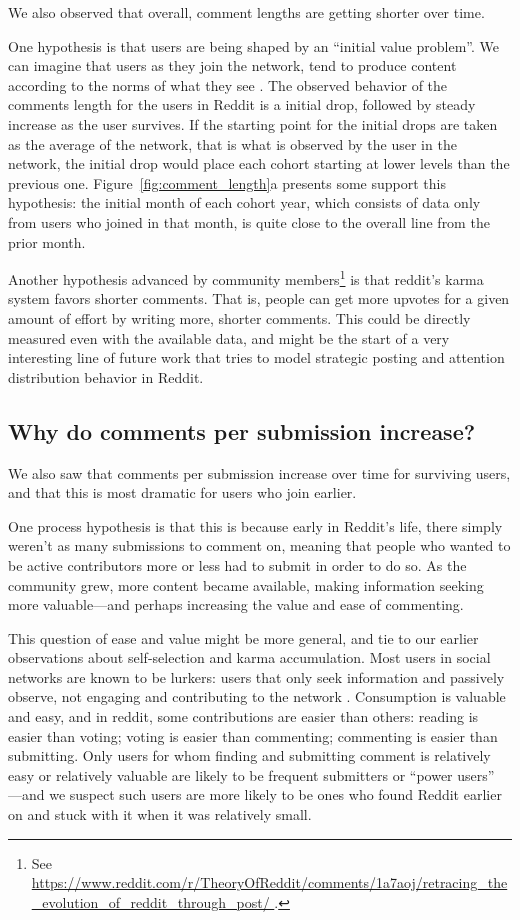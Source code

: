 We also observed that overall, comment lengths are getting shorter over time.  

One hypothesis is that users are being shaped by an ``initial value problem''. We can imagine that users as they join the network, tend to produce content according to the norms of what they see \cite{Kooti2010, Danescu-niculescu-mizil2013}.  The observed behavior of the comments length for the users in Reddit is a initial drop, followed by steady increase as the user survives. If the starting point for the initial drops are taken as the average of the network, that is what is observed by the user in the network, the initial drop would place each cohort starting at lower levels than the previous one.  Figure~\ref{fig:comment_length}a presents some support this hypothesis: the initial month of each cohort year, which consists of data only from users who joined in that month, is quite close to the overall line from the prior month.  

Another hypothesis advanced by community members\footnote{See \url{https://www.reddit.com/r/TheoryOfReddit/comments/1a7aoj/retracing_the_evolution_of_reddit_through_post/  }.} is that reddit's karma system favors shorter comments.  That is, people can get more upvotes for a given amount of effort by writing more, shorter comments.  This could be directly measured even with the available data, and might be the start of a very interesting line of future work that tries to model strategic posting and attention distribution behavior in Reddit. 

\subsection{Why do comments per submission increase?}

We also saw that comments per submission increase over time for surviving users, and that this is most dramatic for users who join earlier.

One process hypothesis is that this is because early in Reddit's life, there simply weren't as many submissions to comment on, meaning that people who wanted to be active contributors more or less had to submit in order to do so. 
As the community grew, more content became available, making information seeking more valuable---and perhaps increasing the value and ease of commenting. 

This question of ease and value might be more general, and tie to our earlier observations about self-selection and karma accumulation.  Most users in social networks are known to be lurkers: users that only seek information and passively observe, not engaging and contributing to the network \cite{Rafaeli2004, Nonnecke2000}.  Consumption is valuable and easy, and in reddit, some contributions are easier than others: reading is easier than voting; voting is easier than commenting; commenting is easier than submitting.  Only users for whom finding and submitting comment is relatively easy or relatively valuable are likely to be frequent submitters or ``power users'' \cite{Panciera2009, Kittur2007}---and we suspect such users are more likely to be ones who found Reddit earlier on and stuck with it when it was relatively small.

